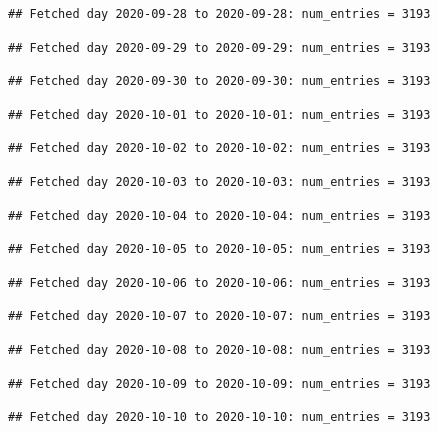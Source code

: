 \documentclass[]{article}
\begin{document}
\begin{verbatim}
## Fetched day 2020-09-28 to 2020-09-28: num_entries = 3193
\end{verbatim}

\begin{verbatim}
## Fetched day 2020-09-29 to 2020-09-29: num_entries = 3193
\end{verbatim}

\begin{verbatim}
## Fetched day 2020-09-30 to 2020-09-30: num_entries = 3193
\end{verbatim}

\begin{verbatim}
## Fetched day 2020-10-01 to 2020-10-01: num_entries = 3193
\end{verbatim}

\begin{verbatim}
## Fetched day 2020-10-02 to 2020-10-02: num_entries = 3193
\end{verbatim}

\begin{verbatim}
## Fetched day 2020-10-03 to 2020-10-03: num_entries = 3193
\end{verbatim}

\begin{verbatim}
## Fetched day 2020-10-04 to 2020-10-04: num_entries = 3193
\end{verbatim}

\begin{verbatim}
## Fetched day 2020-10-05 to 2020-10-05: num_entries = 3193
\end{verbatim}

\begin{verbatim}
## Fetched day 2020-10-06 to 2020-10-06: num_entries = 3193
\end{verbatim}

\begin{verbatim}
## Fetched day 2020-10-07 to 2020-10-07: num_entries = 3193
\end{verbatim}

\begin{verbatim}
## Fetched day 2020-10-08 to 2020-10-08: num_entries = 3193
\end{verbatim}

\begin{verbatim}
## Fetched day 2020-10-09 to 2020-10-09: num_entries = 3193
\end{verbatim}

\begin{verbatim}
## Fetched day 2020-10-10 to 2020-10-10: num_entries = 3193
\end{verbatim}
\end{document}
